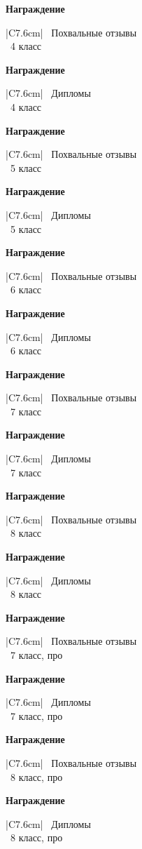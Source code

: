 \def\nagrpage#1#2{
\newpage
\begin{center}
	{\bf\large Награждение} \\ \vspace{1.1cm}
	\Large %
	\begin{tabular}{|C{7.6cm}|}
	\hline
		\, #1
		\vphantom{$\int\limits_0^0$} \\
	\hline
		\, #2 класс
		\vphantom{$\int\limits_0^0$} \\
	\hline
	\end{tabular}
\end{center}
}

\def\nagrpagepro#1#2{
\newpage
\begin{center}
	{\bf\large Награждение} \\ \vspace{1.1cm}
	\Large
	\begin{tabular}{|C{7.6cm}|}
	\hline
		\, #1
		\vphantom{$\int\limits_0^0$} \\
	\hline
		\, #2 класс, про
		\vphantom{$\int\limits_0^0$} \\
	\hline
	\end{tabular}
\end{center}
}

\nagrpage{Похвальные отзывы}{4}
\nagrpage{Дипломы}{4}
\nagrpage{Похвальные отзывы}{5}
\nagrpage{Дипломы}{5}
\nagrpage{Похвальные отзывы}{6}
\nagrpage{Дипломы}{6}
\nagrpage{Похвальные отзывы}{7}
\nagrpage{Дипломы}{7}
\nagrpage{Похвальные отзывы}{8}
\nagrpage{Дипломы}{8}
\nagrpagepro{Похвальные отзывы}{7}
\nagrpagepro{Дипломы}{7}
\nagrpagepro{Похвальные отзывы}{8}
\nagrpagepro{Дипломы}{8}